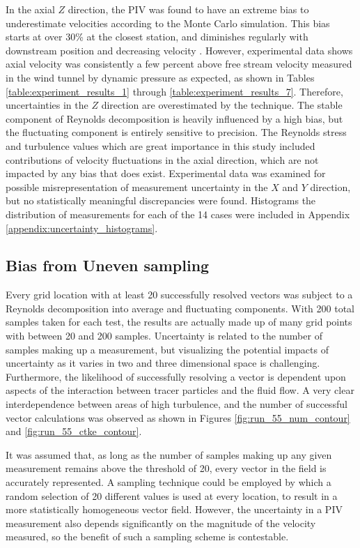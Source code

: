 In the axial $Z$ direction, the PIV was found to have an extreme bias to 
underestimate velocities according to the Monte Carlo simulation. This bias 
starts at over 30\% at the closest station, and diminishes regularly with 
downstream position and decreasing velocity . However, experimental data shows 
axial velocity was consistently a few percent above free stream velocity 
measured in the wind tunnel by dynamic pressure as expected, as shown in Tables
\ref{table:experiment_results_1} through \ref{table:experiment_results_7}. 
Therefore, uncertainties in the $Z$ direction are overestimated by the 
technique. The stable component of Reynolds decomposition is heavily influenced 
by a high bias, but the fluctuating component is entirely sensitive to 
precision. The Reynolds stress and turbulence values which are great importance 
in this study included contributions of velocity fluctuations in the axial 
direction, which are not impacted by any bias that does exist. Experimental 
data was examined for possible misrepresentation of measurement uncertainty in 
the $X$ and $Y$ direction, but no statistically meaningful discrepancies were 
found. Histograms the distribution of measurements for each of the 14 
cases were included in Appendix \ref{appendix:uncertainty_histograms}.


\subsection{Bias from Uneven sampling}

Every grid location with at least 20 successfully resolved vectors was 
subject to a Reynolds decomposition into average and fluctuating components. 
With 200 total samples taken for each test, the results are actually made up of 
many grid points with between 20 and 200 samples. Uncertainty is related to the 
number of samples making up a measurement, but visualizing the potential 
impacts of uncertainty as it varies in two and three dimensional space is 
challenging. Furthermore, the likelihood of successfully resolving a vector is 
dependent upon aspects of the interaction between tracer particles and the 
fluid flow. A very clear interdependence between areas of high turbulence, and 
the number of successful vector calculations was observed as shown in Figures 
\ref{fig:run_55_num_contour} and \ref{fig:run_55_ctke_contour}. 




It was assumed that, as long as the number of samples making up any given 
measurement remains above the threshold of 20, every vector in the field is 
accurately represented. A sampling technique could be employed by 
which a random selection of 20 different values is used at every location, to 
result in a more statistically homogeneous vector field. However, 
the uncertainty in a PIV measurement also depends significantly on the 
magnitude of the velocity measured, so the benefit of such a sampling scheme is 
contestable.